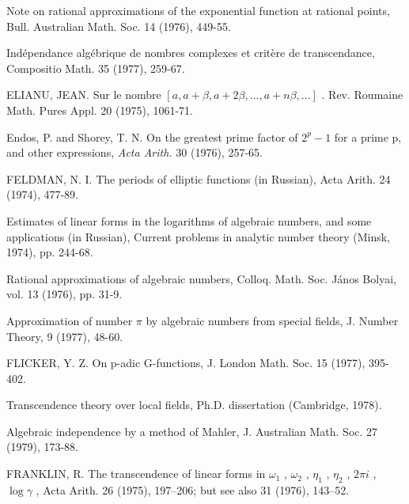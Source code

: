 \begin{hanglist}
    \item \hspace{1.5em} Note on rational approximations of the exponential function at rational points, Bull. Australian Math. Soc. 14 (1976), 449-55.
    \item \hspace{1.5em} Indépendance algébrique de nombres complexes et critère de transcendance, Compositio Math. 35 (1977), 259-67.
    \item ELIANU, JEAN. Sur le nombre  $[a, a + \beta, a + 2\beta, ..., a + n\beta, ...]$ . Rev. Roumaine Math. Pures Appl. 20 (1975), 1061-71.
    \item Endos, P. and Shorey, T. N. On the greatest prime factor of  $2^p-1$  for a prime p, and other expressions, \textit{Acta Arith.} 30 (1976), 257-65.
    \item FELDMAN, N. I. The periods of elliptic functions (in Russian), Acta Arith. 24 (1974), 477-89.
    \item \hspace{1.5em} Estimates of linear forms in the logarithms of algebraic numbers, and some applications (in Russian), Current problems in analytic number theory (Minsk, 1974), pp. 244-68.
    \item \hspace{1.5em} Rational approximations of algebraic numbers, Colloq. Math. Soc. János Bolyai, vol. 13 (1976), pp. 31-9.
    \item \hspace{1.5em} Approximation of number  $\pi$  by algebraic numbers from special fields, J. Number Theory, 9 (1977), 48-60.
    \item FLICKER, Y. Z. On p-adic G-functions, J. London Math. Soc. 15 (1977), 395-402.
    \item \hspace{1.5em} Transcendence theory over local fields, Ph.D. dissertation (Cambridge, 1978).
    \item \hspace{1.5em} Algebraic independence by a method of Mahler, J. Australian Math. Soc. 27 (1979), 173-88.
    \item FRANKLIN, R. The transcendence of linear forms in  $\omega_1$ ,  $\omega_2$ ,  $\eta_1$ ,  $\eta_2$ ,  $2\pi i$ ,  $\log \gamma$ , Acta Arith. 26 (1975), 197–206; but see also 31 (1976), 143–52.

\end{hanglist}
